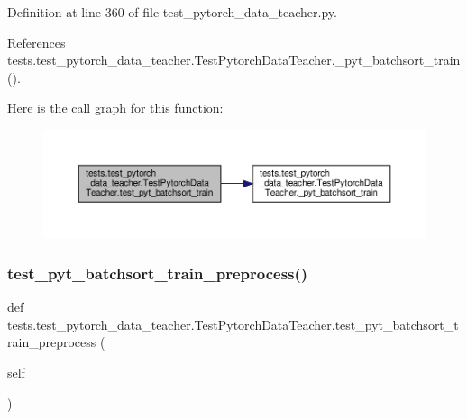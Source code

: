 Definition at line 360 of file test\+\_\+pytorch\+\_\+data\+\_\+teacher.\+py.



References tests.\+test\+\_\+pytorch\+\_\+data\+\_\+teacher.\+Test\+Pytorch\+Data\+Teacher.\+\_\+pyt\+\_\+batchsort\+\_\+train().

Here is the call graph for this function\+:
\nopagebreak
\begin{figure}[H]
\begin{center}
\leavevmode
\includegraphics[width=350pt]{classtests_1_1test__pytorch__data__teacher_1_1TestPytorchDataTeacher_a17540e666ded187d76960e3ef3f43d7b_cgraph}
\end{center}
\end{figure}
\mbox{\label{classtests_1_1test__pytorch__data__teacher_1_1TestPytorchDataTeacher_acf2428b3226bc0cf95d4dbb80877e6d0}} 
\subsubsection{\texorpdfstring{test\+\_\+pyt\+\_\+batchsort\+\_\+train\+\_\+preprocess()}{test\_pyt\_batchsort\_train\_preprocess()}}
{\footnotesize\ttfamily def tests.\+test\+\_\+pytorch\+\_\+data\+\_\+teacher.\+Test\+Pytorch\+Data\+Teacher.\+test\+\_\+pyt\+\_\+batchsort\+\_\+train\+\_\+preprocess (\begin{DoxyParamCaption}\item[{}]{self }\end{DoxyParamCaption})}



